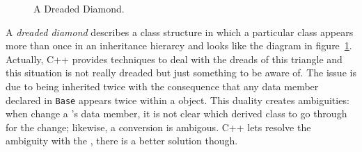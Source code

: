 \newpage
{}
\noindent{}
\begin{figure}%
\centering{}
    \caption{A Dreaded Diamond.}
    \label{fig:dreaded-diamond}
\end{figure}%

A \textit{dreaded diamond} describes a class structure in which a 
particular class appears more than once in an inheritance hierarcy 
and looks like the diagram in figure~\ref{fig:dreaded-diamond}.
\newline
Actually, C++ provides techniques to deal with the dreads of this 
triangle and this situation is not really dreaded but just something to 
be aware of.
\newline
The issue is due to  being inherited 
twice with the consequence that any data member declared in 
\texttt{Base} appears twice within a  object.
\newline
This duality creates ambiguities: when  
change a 's data member, it is not clear which derived 
class to go through for the change; likewise, a conversion 
 is ambigous.
\newline
C++ lets resolve the ambiguity with the , 
there is a better solution though.
\newpage
{}

